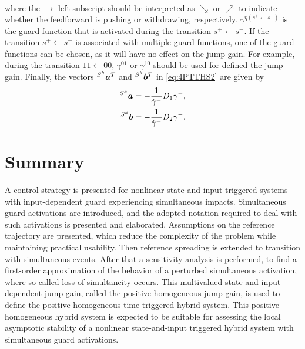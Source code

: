 \documentclass[../DC2017114Bouma.tex]{subfiles}
\begin{document}
\begin{mydef}[PTTHS]
\begin{align}
\end{align}
where the $\rightarrow$ left subscript should be interpreted as $\searrow$ or $\nearrow$ to indicate whether the feedforward is pushing or withdrawing, respectively. $\gamma^{\eta(s^+\leftarrow s^-)}$ is the guard function that is activated during the transition $s^+\leftarrow s^-$. If the transition $s^+\leftarrow s^-$ is associated with multiple guard functions, one of the guard functions can be chosen, as it will have no effect on the jump gain. For example, during the transition $11\leftarrow 00$, $\gamma^{01}$ or $\gamma^{10}$ should be used for defined the jump gain. Finally, the vectors $\hspace{0cm}^{S^k}{\boldsymbol{a}}^T$ and $\hspace{0cm}^{S^k}{\boldsymbol{b}}^T$ in \eqref{eq:4PTTHS2} are given by
\begin{align}
\hspace{0cm}^{S^k}{\boldsymbol{a}} &= -\frac{1}{\dot{\gamma}^{-}}D_1\gamma^{-},\\
\hspace{0cm}^{S^k}{\boldsymbol{b}} &= -\frac{1}{\dot{\gamma}^{-}}D_2\gamma^{-}.
\end{align}
\end{mydef}

%
%
%
%
%
%

\section{Summary}
A control strategy is presented for nonlinear state-and-input-triggered systems with input-dependent guard experiencing simultaneous impacts. Simultaneous guard activations are introduced, and the adopted notation required to deal with such activations is presented and elaborated. Assumptions on the reference trajectory are presented, which reduce the complexity of the problem while maintaining practical usability. Then reference spreading is extended to transition with simultaneous events. After that a sensitivity analysis is performed, to find a first-order approximation of the behavior of a perturbed simultaneous activation, where so-called loss of simultaneity occurs. This multivalued state-and-input dependent jump gain, called the positive homogeneous jump gain, is used to define the positive homogeneous time-triggered hybrid system. This positive homogeneous hybrid system is expected to be suitable for assessing the local asymptotic stability of a nonlinear state-and-input triggered hybrid system with simultaneous guard activations.
\end{document}
